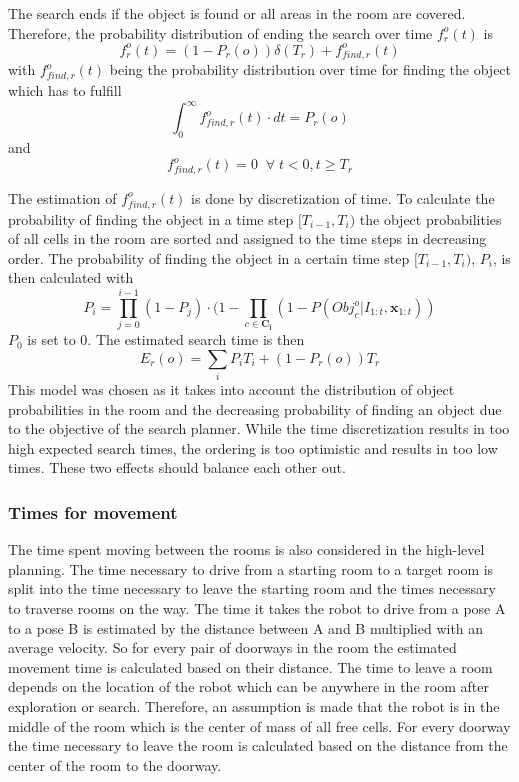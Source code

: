 The search ends if the object is found or all areas in the room are covered. Therefore, the probability distribution of ending the search over time $f_r^o(t)$ is
\begin{equation}
 f_r^o(t)=(1-P_r(o))\delta(T_r)+f_{find,r}^o(t)
\end{equation}
with $f_{find,r}^o(t)$ being the probability distribution over time for finding the object which has to fulfill 
\begin{equation}
 \int_{0}^\infty f_{find,r}^o(t)\cdot dt = P_r(o)
\end{equation}
and
\begin{equation}
 f_{find,r}^o(t) = 0 \;\; \forall \; t < 0, t \geq T_r
\end{equation}

The estimation of $f_{find,r}^o(t)$ is done by discretization of time. To calculate the probability of finding the object in a time step $[T_{i-1},T_i)$ the object probabilities of all cells in the room are sorted and assigned to the time steps in decreasing order. The probability of finding the object in a certain time step $[T_{i-1},T_i)$, $P_i$, is then calculated with
\begin{equation}
 P_{i}=\prod_{j=0}^{i-1}(1-P_{j}) \cdot (1-\prod_{c \in \mathbf{C_i}}(1-P(Obj_{c}^{o}|I_{1:t}, \mathbf{x}_{1:t}))
\end{equation}
$P_{0}$ is set to 0. The estimated search time is then 
\begin{equation}
 E_r(o)=\sum_i P_iT_i+(1-P_r(o))T_r 
\end{equation}
This model was chosen as it takes into account the distribution of object probabilities in the room and the decreasing probability of finding an object due to the objective of the search planner. While the time discretization results in too high expected search times, the ordering is too optimistic and results in too low times. These two effects should balance each other out.

\subsubsection{Times for movement}

The time spent moving between the rooms is also considered in the high-level planning. The time necessary to drive from a starting room to a target room is split into the time necessary to leave the starting room and the times necessary to traverse rooms on the way. The time it takes the robot to drive from a pose A to a pose B is estimated by the distance between A and B multiplied with an average velocity. So for every pair of doorways in the room the estimated movement time is calculated based on their distance. The time to leave a room depends on the location of the robot which can be anywhere in the room after exploration or search. Therefore, an assumption is made that the robot is in the middle of the room which is the center of mass of all free cells. For every doorway the time necessary to leave the room is calculated based on the distance from the center of the room to the doorway.